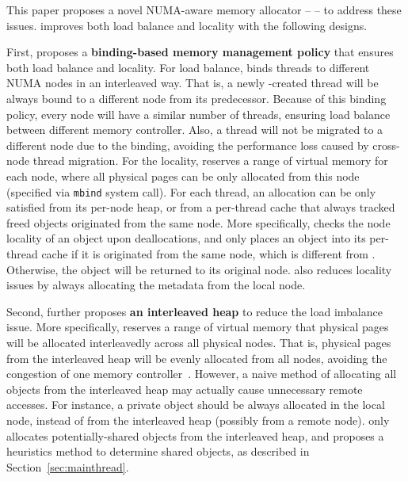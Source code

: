 This paper proposes a novel NUMA-aware memory allocator -- \NM{} -- to address these  issues. \NM{} improves both load balance and locality with the following designs.  

First, \NM{} proposes a \textbf{binding-based memory management policy} that ensures both load balance and locality. For load balance, \NM{} binds threads to different NUMA nodes in an interleaved way. That is, a newly -created thread will be always bound to a different node from its predecessor. Because of this binding policy, every node will have a similar number of threads, ensuring load balance between different memory controller. Also, a thread will not be migrated to a different node due to the binding, avoiding the performance loss caused by cross-node thread migration. For the locality, \NM{} reserves a range of virtual memory for each node, where all physical pages can be only allocated from this node (specified via \texttt{mbind} system call). For each thread, an allocation can be only satisfied from its per-node heap, or from a per-thread cache that always tracked freed objects originated from the same node. More specifically, \NM{} checks the node locality of an object upon deallocations, and only places an object into its per-thread cache if it is originated from the same node, which is different from \TN{}. Otherwise, the object will be returned to its original node. \NM{} also reduces locality issues by always allocating the metadata from the local node.  


  
Second, \NM{} further proposes \textbf{an interleaved heap} to reduce the load imbalance issue. More specifically, \NM{} reserves a range of virtual memory that physical pages will be allocated interleavedly across all physical nodes. That is,  physical pages from the interleaved heap will be evenly allocated from all nodes, avoiding the congestion of one memory controller~\cite{Blagodurov:2011:CNC:2002181.2002182}. However, a naive method of allocating all objects from the interleaved heap may actually cause unnecessary remote accesses. For instance, a private object should be always allocated in the local node, instead of from the interleaved heap (possibly from a remote node). \NM{} only allocates potentially-shared objects from the interleaved heap, and proposes a heuristics method to determine shared objects, as described in Section~\ref{sec:mainthread}.  

